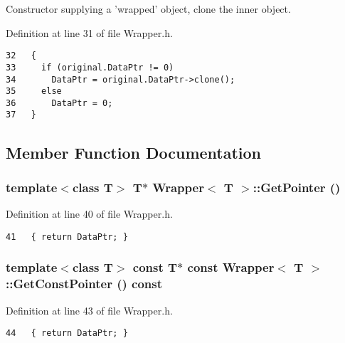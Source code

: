 Constructor supplying a 'wrapped' object, clone the inner object. 



Definition at line 31 of file Wrapper.h.

\begin{Code}\begin{verbatim}32   {
33     if (original.DataPtr != 0)
34       DataPtr = original.DataPtr->clone();
35     else
36       DataPtr = 0;
37   }
\end{verbatim}
\end{Code}




\subsection{Member Function Documentation}
\subsubsection{\setlength{\rightskip}{0pt plus 5cm}template$<$class T$>$ T$\ast$ {\bf Wrapper}$<$ T $>$::GetPointer ()\hspace{0.3cm}{\tt  [inline]}}\label{classWrapper_954084dfe67131560f58d85cb1c4190e}




Definition at line 40 of file Wrapper.h.

\begin{Code}\begin{verbatim}41   { return DataPtr; }
\end{verbatim}
\end{Code}


\subsubsection{\setlength{\rightskip}{0pt plus 5cm}template$<$class T$>$ const T$\ast$ const {\bf Wrapper}$<$ T $>$::GetConstPointer () const\hspace{0.3cm}{\tt  [inline]}}\label{classWrapper_5e9f52d10a6098286c2a552cf19ac619}




Definition at line 43 of file Wrapper.h.

\begin{Code}\begin{verbatim}44   { return DataPtr; }
\end{verbatim}
\end{Code}


